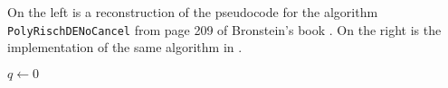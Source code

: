 On the left is a reconstruction of the pseudocode for the algorithm \texttt{Pol\-y\-Risch\-DE\-No\-Can\-cel} from page 209 of Bronstein's book \cite{bronstein2005symbolic}. On the right is the implementation of the same algorithm in \SymPy.  

\footnotesize
\begin{algorithm}[H]
    \dontprintsemicolon
    \;
    \BlankLine
    \Indp
    $q \leftarrow 0$\;
\end{algorithm}
\normalsize
